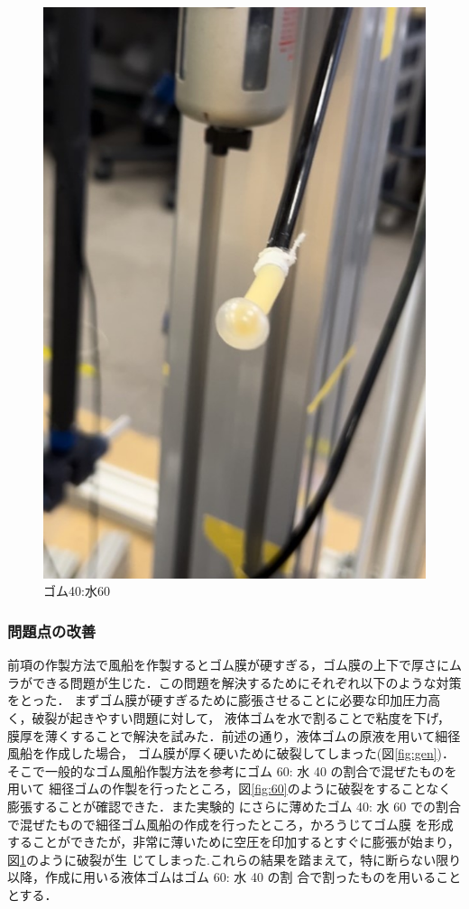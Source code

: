 \begin{figure}[h]
\begin{minipage}{0.33\hsize}
      \includegraphics[scale=0.3]{pic/zu5.jpg}
      \caption{ゴム40:水60}
      \label{fig:40}
  \end{minipage} 
\end{figure}

\subsubsection{問題点の改善}
前項の作製方法で風船を作製するとゴム膜が硬すぎる，ゴム膜の上下で厚さにムラができる問題が生じた．この問題を解決するためにそれぞれ以下のような対策をとった．
まずゴム膜が硬すぎるために膨張させることに必要な印加圧力高く，破裂が起きやすい問題に対して，
液体ゴムを水で割ることで粘度を下げ，膜厚を薄くすることで解決を試みた．前述の通り，液体ゴムの原液を用いて細径風船を作成した場合，
ゴム膜が厚く硬いために破裂してしまった(図\ref{fig:gen})．そこで一般的なゴム風船作製方法を参考にゴム 60: 水 40 の割合で混ぜたものを用いて
細径ゴムの作製を行ったところ\cite{}，図\ref{fig:60}のように破裂をすることなく膨張することが確認できた．また実験的
にさらに薄めたゴム 40: 水 60 での割合で混ぜたもので細径ゴム風船の作成を行ったところ，かろうじてゴム膜
を形成することができたが，非常に薄いために空圧を印加するとすぐに膨張が始まり，図\ref{fig:40}のように破裂が生
じてしまった.これらの結果を踏まえて，特に断らない限り以降，作成に用いる液体ゴムはゴム 60: 水 40 の割
合で割ったものを用いることとする．


